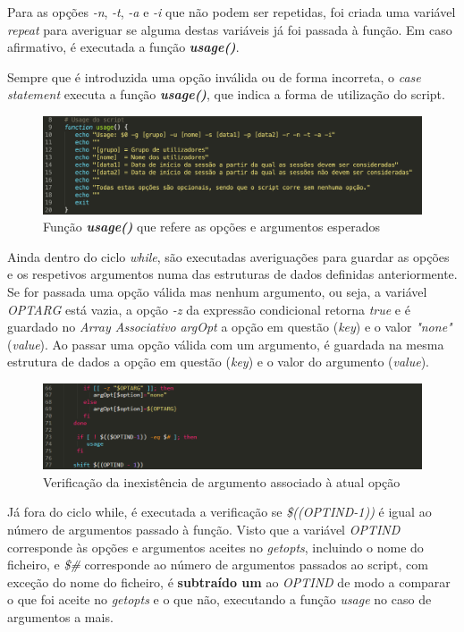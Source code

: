 \documentclass[10pt,portuguese]{article}
\begin{document}
\par Para as opções \textit{-n}, \textit{-t}, \textit{-a} e \textit{-i} que não podem ser repetidas, foi criada uma variável \textit{repeat} para averiguar se alguma destas variáveis já foi passada à função. Em caso afirmativo, é executada a função \textbf{\textit{usage()}}.
\par Sempre que é introduzida uma opção inválida ou de forma incorreta, o \textit{case statement} executa a função \textbf{\textit{usage()}}, que indica a forma de utilização do script.
\begin{figure}[!h]
    \centering
    \includegraphics[width=\textwidth]{usage.png}
    \caption{Função \textbf{\textit{usage()}} que refere as opções e argumentos esperados}
\end{figure}
\newline
\par Ainda dentro do ciclo \textit{while}, são executadas averiguações para guardar as opções e os respetivos argumentos numa das estruturas de dados definidas anteriormente. Se for passada uma opção válida mas nenhum argumento, ou seja, a variável \textit{OPTARG} está vazia, a opção \textit{-z} da expressão condicional retorna \textit{true} e é guardado no \textit{Array Associativo} \textit{argOpt} a opção em questão (\textit{key}) e o valor \textit{"none"} (\textit{value}). Ao passar uma opção válida com um argumento, é guardada na mesma estrutura de dados a opção em questão (\textit{key}) e o valor do argumento (\textit{value}).
\begin{figure}[!h]
    \centering
    \includegraphics[width=\textwidth]{optarg.png}
    \caption{Verificação da inexistência de argumento associado à atual opção}
\end{figure}
\newline
\par Já fora do ciclo while, é executada a verificação se \textit{\$((OPTIND-1))} é igual ao número de argumentos passado à função. Visto que a variável \textit{OPTIND} corresponde às opções e argumentos aceites no \textit{getopts}, incluindo o nome do ficheiro, e \textit{\$\#} corresponde ao número de argumentos passados ao script, com exceção do nome do ficheiro, é \textbf{subtraído um} ao \textit{OPTIND} de modo a comparar o que foi aceite no \textit{getopts} e o que não, executando a função \textit{usage} no caso de argumentos a mais.
\end{document}
